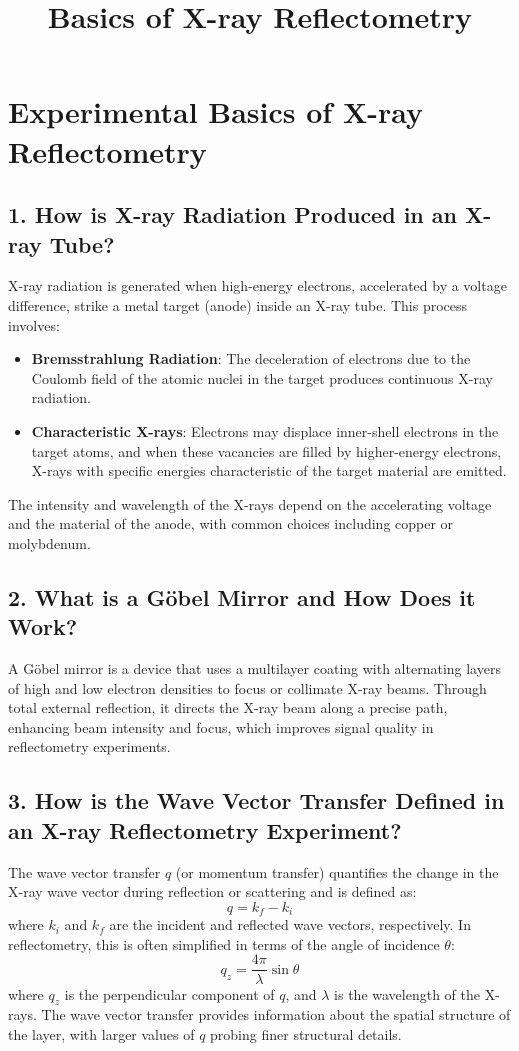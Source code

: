 \documentclass[a4paper,12pt]{article}
\title{Basics of X-ray Reflectometry}
\author{}
\date{}
\begin{document}
\maketitle

\section*{Experimental Basics of X-ray Reflectometry}

\subsection*{1. How is X-ray Radiation Produced in an X-ray Tube?}
X-ray radiation is generated when high-energy electrons, accelerated by a voltage difference, strike a metal target (anode) inside an X-ray tube. This process involves:
\begin{itemize}
    \item \textbf{Bremsstrahlung Radiation}: The deceleration of electrons due to the Coulomb field of the atomic nuclei in the target produces continuous X-ray radiation.
    \item \textbf{Characteristic X-rays}: Electrons may displace inner-shell electrons in the target atoms, and when these vacancies are filled by higher-energy electrons, X-rays with specific energies characteristic of the target material are emitted.
\end{itemize}
The intensity and wavelength of the X-rays depend on the accelerating voltage and the material of the anode, with common choices including copper or molybdenum.

\subsection*{2. What is a Göbel Mirror and How Does it Work?}
A Göbel mirror is a device that uses a multilayer coating with alternating layers of high and low electron densities to focus or collimate X-ray beams. Through total external reflection, it directs the X-ray beam along a precise path, enhancing beam intensity and focus, which improves signal quality in reflectometry experiments.

\subsection*{3. How is the Wave Vector Transfer Defined in an X-ray Reflectometry Experiment?}
The wave vector transfer \( q \) (or momentum transfer) quantifies the change in the X-ray wave vector during reflection or scattering and is defined as:
\[
q = k_f - k_i
\]
where \( k_i \) and \( k_f \) are the incident and reflected wave vectors, respectively. In reflectometry, this is often simplified in terms of the angle of incidence \( \theta \):
\[
q_z = \frac{4\pi}{\lambda} \sin \theta
\]
where \( q_z \) is the perpendicular component of \( q \), and \( \lambda \) is the wavelength of the X-rays. The wave vector transfer provides information about the spatial structure of the layer, with larger values of \( q \) probing finer structural details.
\end{document}
